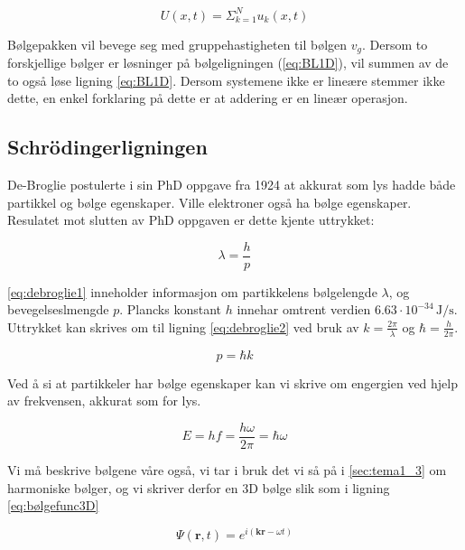 \begin{equation}
    U(x,t) = \Sigma_{k=1}^N u_k(x,t)
\end{equation}

Bølgepakken vil bevege seg med gruppehastigheten til bølgen $v_g$. Dersom to forskjellige bølger er løsninger på bølgeligningen (\ref{eq:BL1D}), vil summen av de to også løse ligning \ref{eq:BL1D}. Dersom systemene ikke er lineære stemmer ikke dette, en enkel forklaring på dette er at addering er en lineær operasjon.

\subsection{Schrödingerligningen}
\label{sec:tema1_6}
De-Broglie postulerte i sin PhD oppgave fra 1924 at akkurat som lys hadde både partikkel og bølge egenskaper. Ville elektroner også ha bølge egenskaper. Resulatet mot slutten av PhD oppgaven er dette kjente uttrykket: 

\begin{equation}
    \label{eq:debroglie1}
    \lambda = \frac{h}{p}
\end{equation}

\autoref{eq:debroglie1} inneholder informasjon om partikkelens bølgelengde $\lambda$, og bevegelseslmengde $p$. Plancks konstant $h$ innehar omtrent verdien $6.63\cdot10^{-34}\,\si{\joule\per\second}$. Uttrykket kan skrives om til ligning \ref{eq:debroglie2} ved bruk av $k=\frac{2\pi}{\lambda}$ og $\hbar = \frac{h}{2\pi}$.

\begin{equation}
    \label{eq:debroglie2}
    p = \hbar k
\end{equation}

Ved å si at partikkeler har bølge egenskaper kan vi skrive om engergien ved hjelp av frekvensen, akkurat som for lys.

\begin{equation}
    \label{eq:energy}
    E = hf = \frac{h\omega}{2\pi}=\hbar\omega
\end{equation}

Vi må beskrive bølgene våre også, vi tar i bruk det vi så på i \autoref{sec:tema1_3} om harmoniske bølger, og vi skriver derfor en 3D bølge slik som i ligning \ref{eq:bølgefunc3D}

\begin{equation}
    \label{eq:bølgefunc3D}
    \Psi(\textbf{r},t) = e^{i(\textbf{k}\textbf{r}-\omega t)}
\end{equation}

